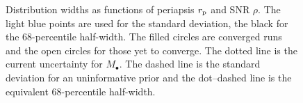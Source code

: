 \begin{figure}
 \quad
{}
\caption{Distribution widths as functions of periapsis $r_\mathrm{p}$ and SNR $\rho$. The light blue points are used for the standard deviation, the black for the $68$-percentile half-width. The filled circles are converged runs and the open circles for those yet to converge. The dotted line is the current uncertainty for $M_\bullet$. The dashed line is the standard deviation for an uninformative prior and the dot--dashed line is the equivalent $68$-percentile half-width.}
\label{fig:sigmas}
\end{figure}
